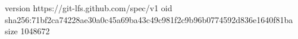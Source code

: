 version https://git-lfs.github.com/spec/v1
oid sha256:71bf2ca74228ae30a0c45a69ba43c49c981f2c9b96b0774592d836e1640f81ba
size 1048672
